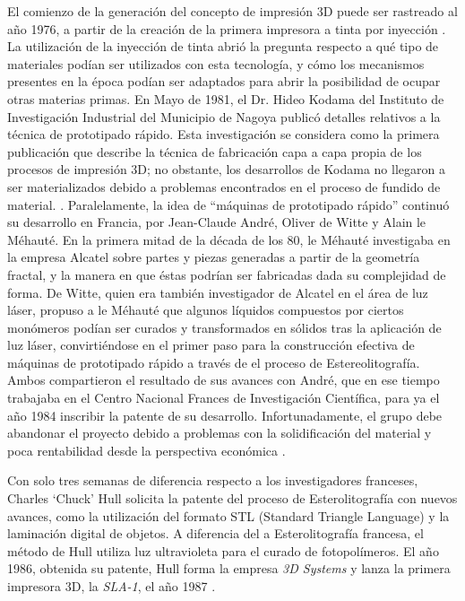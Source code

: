 El comienzo de la generación del concepto de impresión 3D puede ser rastreado al año 1976, a partir de la creación de la primera impresora a tinta por inyección \citep{maxey2013}. La utilización de la inyección de tinta abrió la pregunta respecto a qué tipo de materiales podían ser utilizados con esta tecnología, y cómo los mecanismos presentes en la época podían ser adaptados para abrir la posibilidad de ocupar otras materias primas. En Mayo de 1981, el Dr. Hideo Kodama del Instituto de Investigación Industrial del Municipio de Nagoya publicó detalles relativos a la técnica de prototipado rápido. Esta investigación se considera como la primera publicación que describe la técnica de fabricación capa a capa propia de los procesos de impresión 3D; no obstante, los desarrollos de Kodama no llegaron a ser materializados debido a problemas encontrados en el proceso de fundido de material. \citep{tresdsourced2020}. Paralelamente, la idea de ``máquinas de prototipado rápido'' continuó su desarrollo en Francia, por Jean-Claude André, Oliver de Witte y Alain le Méhauté. En la primera mitad de la década de los 80, le Méhauté investigaba en la empresa Alcatel sobre partes y piezas generadas a partir de la geometría fractal, y la manera en que éstas podrían ser fabricadas dada su complejidad de forma.
De Witte, quien era también investigador de Alcatel en el área de luz láser, propuso a le Méhauté que algunos líquidos compuestos por ciertos monómeros podían ser curados y transformados en sólidos tras la aplicación de luz láser, convirtiéndose en el primer paso para la construcción efectiva de máquinas de prototipado rápido a través de el proceso de Estereolitografía. Ambos compartieron el resultado de sus avances con André, que en ese tiempo trabajaba en el Centro Nacional Frances de Investigación Científica, para ya el año 1984 inscribir la patente de su desarrollo. Infortunadamente, el grupo debe abandonar el proyecto debido a problemas con la solidificación del material y poca rentabilidad desde la perspectiva económica \citep{alltresdp2018}.\

Con solo tres semanas de diferencia respecto a los investigadores franceses, Charles `Chuck' Hull solicita la patente del proceso de Esterolitografía con nuevos avances, como la utilización del formato STL (Standard Triangle Language) y la laminación digital de objetos. A diferencia del a Esterolitografía francesa, el método de Hull utiliza luz ultravioleta para el curado de fotopolímeros. El año 1986, obtenida su patente, Hull forma la empresa \textit{3D Systems} y lanza la primera impresora 3D, la \textit{SLA-1}, el año 1987 \citep{tresdsourced2020}.


